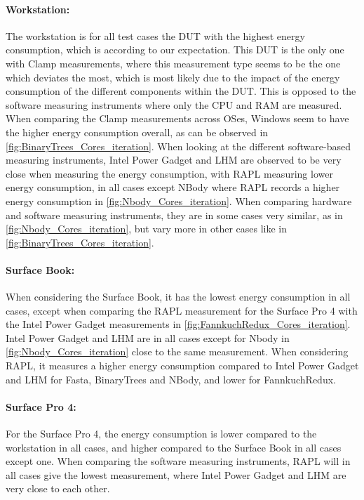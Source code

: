 \paragraph{Workstation:} The workstation is for all test cases the DUT with the highest energy consumption, which is according to our expectation. This DUT is the only one with Clamp measurements, where this measurement type seems to be the one which deviates the most, which is most likely due to the impact of the energy consumption of the different components within the DUT. This is opposed to the software measuring instruments where only the CPU and RAM are measured. When comparing the Clamp measurements across OSes, Windows seem to have the higher energy consumption overall, as can be observed in \cref{fig:BinaryTrees_Cores_iteration}. When looking at the different software-based measuring instruments, Intel Power Gadget and LHM are observed to be very close when measuring the energy consumption, with RAPL measuring lower energy consumption, in all cases except NBody where RAPL records a higher energy consumption in \cref{fig:Nbody_Cores_iteration}. When comparing hardware and software measuring instruments, they are in some cases very similar, as in \cref{fig:Nbody_Cores_iteration}, but vary more in other cases like in \cref{fig:BinaryTrees_Cores_iteration}.

\paragraph{Surface Book:} When considering the Surface Book, it has the lowest energy consumption in all cases, except when comparing the RAPL measurement for the Surface Pro 4 with the Intel Power Gadget measurements in \cref{fig:FannkuchRedux_Cores_iteration}. Intel Power Gadget and LHM are in all cases except for Nbody in \cref{fig:Nbody_Cores_iteration} close to the same measurement. When considering RAPL, it measures a higher energy consumption compared to Intel Power Gadget and LHM for Fasta, BinaryTrees and NBody, and lower for FannkuchRedux.

\paragraph{Surface Pro 4:} For the Surface Pro 4, the energy consumption is lower compared to the workstation in all cases, and higher compared to the Surface Book in all cases except one. When comparing the software measuring instruments, RAPL will in all cases give the lowest measurement, where Intel Power Gadget and LHM are very close to each other.



